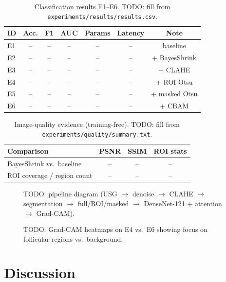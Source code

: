 \documentclass[a4paper,fleqn]{cas-sc}
\begin{document}
\begin{table}[width=\textwidth,pos=ht]
\caption{Classification results E1--E6. TODO: fill from \texttt{experiments/results/results.csv}.}\label{tbl:results}
\begin{tabular*}{\tblwidth}{@{}lcccccc@{}}
\toprule
ID & Acc. & F1 & AUC & Params & Latency & Note \\
\midrule
E1 & -- & -- & -- & -- & -- & baseline \\
E2 & -- & -- & -- & -- & -- & + BayesShrink \\
E3 & -- & -- & -- & -- & -- & + CLAHE \\
E4 & -- & -- & -- & -- & -- & + ROI Otsu \\
E5 & -- & -- & -- & -- & -- & + masked Otsu \\
E6 & -- & -- & -- & -- & -- & + CBAM \\
\bottomrule
\end{tabular*}
\end{table}

\begin{table}[width=\textwidth,pos=ht]
\caption{Image-quality evidence (training-free). TODO: fill from \texttt{experiments/quality/summary.txt}.}\label{tbl:quality}
\begin{tabular*}{\tblwidth}{@{}lccc@{}}
\toprule
Comparison & PSNR & SSIM & ROI stats \\
\midrule
BayesShrink vs.\ baseline & -- & -- & -- \\
ROI coverage / region count & -- & -- & -- \\
\bottomrule
\end{tabular*}
\end{table}

\begin{figure}[pos=ht]
\centering
\caption{TODO: pipeline diagram (USG $\rightarrow$ denoise $\rightarrow$ CLAHE $\rightarrow$ segmentation $\rightarrow$ full/ROI/masked $\rightarrow$ DenseNet-121 + attention $\rightarrow$ Grad-CAM).}\label{fig:pipeline}
\end{figure}

\begin{figure}[pos=ht]
\centering
\caption{TODO: Grad-CAM heatmaps on E4 vs.\ E6 showing focus on follicular regions vs.\ background.}\label{fig:gradcam}
\end{figure}

\section{Discussion}\label{sec:discussion}
\end{document}
